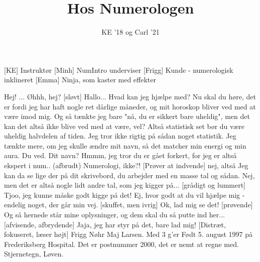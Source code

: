 \documentclass[a4paper,11pt]{article}
\title{Hos Numerologen}
\author{KE '18 og Carl '21}
\begin{document}
\maketitle

\begin{roles}
[KE] Instruktør
[Minh] NumIntro underviser
[Frigg] Kunde - numerologisk inklineret
[Emma] Ninja, som kaster med effekter
\end{roles}

\begin{sketch}
 Hej!
 ...
 Øhhh, hej?
[sløvt] Hallo... Hvad kan jeg hjælpe med? 
 Nu skal du høre, det er fordi jeg har haft nogle ret dårlige måneder, og mit horoskop bliver ved med at være imod mig. Og så tænkte jeg bare "nå, du er sikkert bare uheldig", men det kan det altså ikke blive ved med at være, vel?
 Altså statistisk set bør du være uheldig halvdelen af tiden.
 Jeg tror ikke rigtig på sådan noget statistik. Jeg tænkte mere, om jeg skulle ændre mit navn, så det matcher min energi og min aura. Du ved.
 Dit navn? Hmmm, jeg tror du er gået forkert, for jeg er altså ekspert i num.. (afbrudt)
 Numerologi, ikke?!
[Prøver at indvende] nej, altså
 Jeg kan da se lige der på dit skrivebord, du arbejder med en masse tal og sådan.
 Nej, men det er altså nogle lidt andre tal, som jeg kigger på... 
[grådigt og lummert] Tjoo, jeg kunne måske godt kigge på det!
 Ej, hvor godt at du vil hjælpe mig - endelig noget, der går min vej.
[skuffet, men ivrig] Ok, lad mig se det!
[prøvende] Og så hernede står mine oplysninger, og dem skal du så putte ind her...
[afvisende, afbrydende] Jaja, jeg har styr på det, bare lad mig! 
[Distræt, fokuseret, læser højt] Frigg Nøhr Maj Larsen. 
 Med 3 g'er 
 Født 5. august 1997 på Frederiksberg Hospital. Det er postnummer 2000, det er nemt at regne med. Stjernetegn, Løven. 

\end{sketch}
\end{document}
